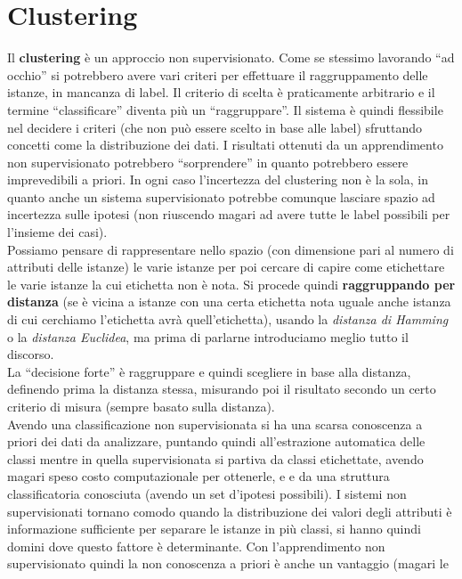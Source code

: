 \chapter{Clustering}
\label{Capitolo 7}
Il \textbf{clustering} è un approccio non supervisionato. Come se stessimo
lavorando ``ad occhio'' si potrebbero avere vari criteri per effettuare il
raggruppamento delle istanze, in mancanza di label. Il criterio di scelta è
praticamente arbitrario e il termine ``classificare'' diventa più un
``raggruppare''. Il sistema è quindi flessibile nel decidere i criteri (che non
può essere scelto in base alle label) sfruttando concetti come la distribuzione
dei dati. I risultati ottenuti da un apprendimento
non supervisionato potrebbero ``sorprendere'' in quanto potrebbero essere
imprevedibili a priori. In ogni caso l'incertezza del clustering non è la sola,
in quanto anche un sistema supervisionato potrebbe comunque lasciare spazio ad
incertezza sulle ipotesi (non riuscendo magari ad avere tutte le label possibili
per l'insieme dei casi).\\ 
Possiamo pensare di rappresentare nello spazio (con dimensione pari al numero di
attributi delle istanze) le varie istanze per poi cercare di capire come
etichettare le varie istanze la cui etichetta non è nota. Si procede quindi
\textbf{raggruppando per distanza} (se è vicina a istanze con una certa
etichetta nota uguale anche istanza di cui cerchiamo l'etichetta avrà
quell'etichetta), usando la \textit{distanza di Hamming} o la \textit{distanza
  Euclidea}, ma prima di parlarne introduciamo meglio tutto il discorso. \\
La ``decisione forte'' è raggruppare e quindi scegliere in base alla distanza,
definendo prima la distanza stessa, misurando poi il risultato secondo un certo
criterio di misura (sempre basato sulla distanza).\\
Avendo una classificazione non supervisionata si ha una scarsa conoscenza a
priori dei dati da analizzare, puntando quindi all'estrazione automatica delle
classi mentre in quella supervisionata si partiva da classi etichettate, avendo
magari speso costo computazionale per ottenerle, e e da una struttura
classificatoria conosciuta (avendo un set d'ipotesi possibili). I sistemi non
supervisionati tornano comodo quando la distribuzione dei valori degli attributi
è informazione sufficiente per separare le istanze in più classi, si hanno
quindi domini dove questo fattore è determinante. Con l'apprendimento non
supervisionato quindi la non conoscenza a priori è anche un vantaggio (magari le
